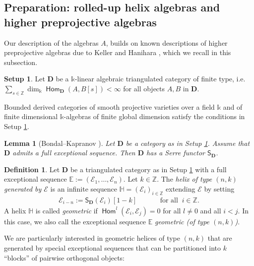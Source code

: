 \documentclass[a4paper,11pt, reqno]{amsart}
\def\E{\mathbb E}
\def\H{\mathbb H}
\def\Z{\mathbb Z}
\def\DD{\mathbf D}
\def\sE{\mathscr{E}}
\newcommand{\opname}[1]{\operatorname{\mathsf{#1}}}
\newcommand{\Hom}{\opname{Hom}}
\newcommand{\bS}{\mathsf{S}}
\theoremstyle{plain}
\newtheorem{lemma}[dummy]{Lemma}
\theoremstyle{definition}
\newtheorem{definition}[dummy]{Definition}
\newtheorem{setup}[dummy]{Setup}
\numberwithin{equation}{section}
\begin{document}
\subsection{Preparation: rolled-up helix algebras and higher preprojective algebras}

Our description of the algebras $A$, builds on known descriptions of higher preprojective algebras due to Keller \cite{KellerCY} and Hanihara \cite{Hanihara2}, which we recall in this subsection.

\begin{setup}\label{Set:fintype}
    Let $\DD$ be a $\mathbb k$-linear algebraic triangulated category of finite type, i.e. $ \sum_{s \in \Z} \dim_{\mathbb k} \Hom_\DD (A , B [s]) < \infty$ for all objects $A, B$ in $\DD$.
\end{setup}

Bounded derived categories of smooth projective varieties over a field $\mathbb k$ and of finite dimensional $\mathbb k$-algebras of finite global dimension satisfy the conditions in Setup \ref{Set:fintype}.

\begin{lemma}[Bondal--Kapranov {\cite[Corollary to Theorem 2.10 \& Corollary 3.5]{bondal-kapranov}}]
    Let $\DD$ be a category as in Setup \ref{Set:fintype}. Assume that $\DD$ admits a full exceptional sequence. Then $\DD$ has a Serre functor $\bS_\DD$.
\end{lemma}


    

\begin{definition}\label{def:geom-type}
     Let $\DD$ be a triangulated category as in Setup \ref{Set:fintype} with a full exceptional sequence $\E:=(\sE_1, \ldots, \sE_n)$. Let $k \in \Z$. The \emph{helix of type $(n,k)$  generated by $\sE$} is an infinite sequence $\mathbb{H}=(\sE_i)_{i \in \Z}$ extending $\sE$ by setting 
    \begin{align}
        \sE_{i-n}:=\bS_\DD(\sE_{i})[1-k] \qquad \quad \text{ for all } \ i \in \Z.
    \end{align}
    A helix $\H$ is called \emph{geometric} if $\Hom^l(\sE_i, \sE_j)=0$ for all $l \neq 0$ and all $i<j$. {In this case, we also call the exceptional sequence $\E$ \emph{geometric (of type $(n,k)$)}.} 
\end{definition}

We are particularly interested in geometric helices of type $(n, k)$ that are generated by special exceptional sequences that can be partitioned into $k$ ``blocks'' of pairwise orthogonal objects:  
\end{document}
